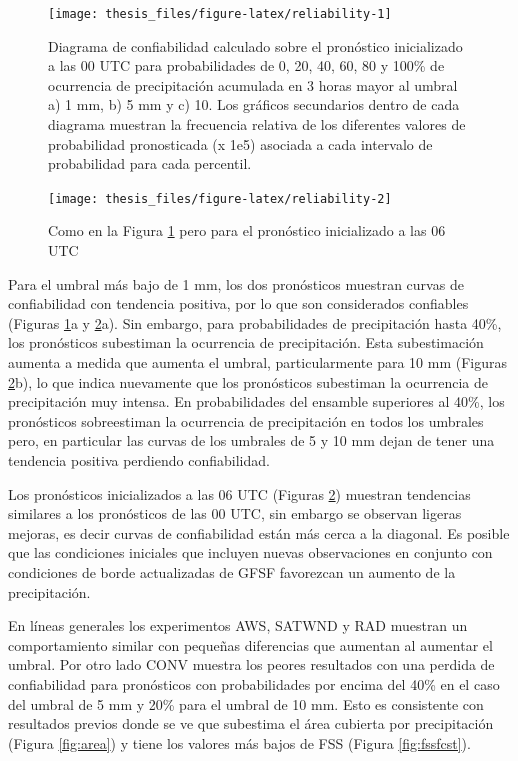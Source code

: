 \documentclass[12pt,oneside,a4paper]{reedthesis}
\begin{document}
\begin{figure}

{\centering \texttt{[image: thesis\_files/figure-latex/reliability-1]} 

}

\caption{Diagrama de confiabilidad calculado sobre el pronóstico inicializado a las 00 UTC para probabilidades de 0, 20, 40, 60, 80 y 100\% de ocurrencia de precipitación acumulada en 3 horas mayor al umbral a) 1 mm, b) 5 mm y c) 10. Los gráficos secundarios dentro de cada diagrama muestran la frecuencia relativa de los diferentes valores de probabilidad pronosticada (x 1e5) asociada a cada intervalo de probabilidad para cada percentil.}\label{fig:reliability-1}
\end{figure}
\begin{figure}

{\centering \texttt{[image: thesis\_files/figure-latex/reliability-2]} 

}

\caption{Como en la Figura \ref{fig:reliability-1} pero para el pronóstico inicializado a las 06 UTC}\label{fig:reliability-2}
\end{figure}
Para el umbral más bajo de 1 mm, los dos pronósticos muestran curvas de confiabilidad con tendencia positiva, por lo que son considerados confiables (Figuras \ref{fig:reliability-1}a y \ref{fig:reliability-2}a). Sin embargo, para probabilidades de precipitación hasta 40\%, los pronósticos subestiman la ocurrencia de precipitación. Esta subestimación aumenta a medida que aumenta el umbral, particularmente para 10 mm (Figuras \ref{fig:reliability-2}b), lo que indica nuevamente que los pronósticos subestiman la ocurrencia de precipitación muy intensa. En probabilidades del ensamble superiores al 40\%, los pronósticos sobreestiman la ocurrencia de precipitación en todos los umbrales pero, en particular las curvas de los umbrales de 5 y 10 mm dejan de tener una tendencia positiva perdiendo confiabilidad.

Los pronósticos inicializados a las 06 UTC (Figuras \ref{fig:reliability-2}) muestran tendencias similares a los pronósticos de las 00 UTC, sin embargo se observan ligeras mejoras, es decir curvas de confiabilidad están más cerca a la diagonal. Es posible que las condiciones iniciales que incluyen nuevas observaciones en conjunto con condiciones de borde actualizadas de GFSF favorezcan un aumento de la precipitación.

En líneas generales los experimentos AWS, SATWND y RAD muestran un comportamiento similar con pequeñas diferencias que aumentan al aumentar el umbral. Por otro lado CONV muestra los peores resultados con una perdida de confiabilidad para pronósticos con probabilidades por encima del 40\% en el caso del umbral de 5 mm y 20\% para el umbral de 10 mm. Esto es consistente con resultados previos donde se ve que subestima el área cubierta por precipitación (Figura \ref{fig:area}) y tiene los valores más bajos de FSS (Figura \ref{fig:fssfcst}).
\end{document}
